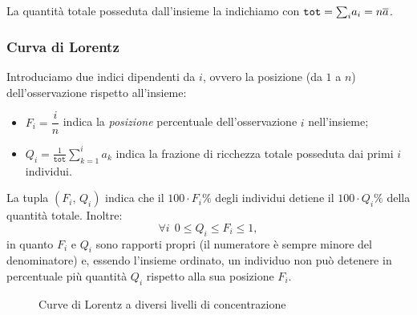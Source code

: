 \noindent La quantità totale posseduta dall'insieme la indichiamo con $\mathtt{tot} = {\sum}_i a_i = n \overline a$.

\subsubsection{Curva di Lorentz}

Introduciamo due indici dipendenti da $i$, ovvero la posizione (da $1$ a $n$) dell'osservazione rispetto all'insieme: \begin{itemize}
    \item $\boxed{F_i = \dfrac in}$ indica la \textit{posizione} percentuale dell'osservazione $i$ nell'insieme;
    \item $\displaystyle \boxed{Q_i = \frac{1}{\mathtt{tot}} \sum_{k=1}^i a_k}$ indica la frazione di ricchezza totale posseduta dai primi $i$ individui.
\end{itemize}

\noindent La tupla  $(F_i, \, Q_i)$ indica che il $100 \cdot F_i \%$ degli individui detiene il $100 \cdot Q_i \%$ della quantità totale. Inoltre:
\[
\forall i \ \  0 \leq Q_i \leq F_i \leq 1,
\]
in quanto $F_i$ e $Q_i$ sono rapporti propri (il numeratore è sempre minore del denominatore) e, essendo l'insieme ordinato, un individuo non può detenere in percentuale più quantità $Q_i$ rispetto alla sua posizione $F_i$.

\begin{figure}[h]
\vspace*{\abovedisplayskip}
\centering
{}
\caption{Curve di Lorentz a diversi livelli di concentrazione}
\label{fig:lorentz}
\vspace*{\abovedisplayskip}
\end{figure}

